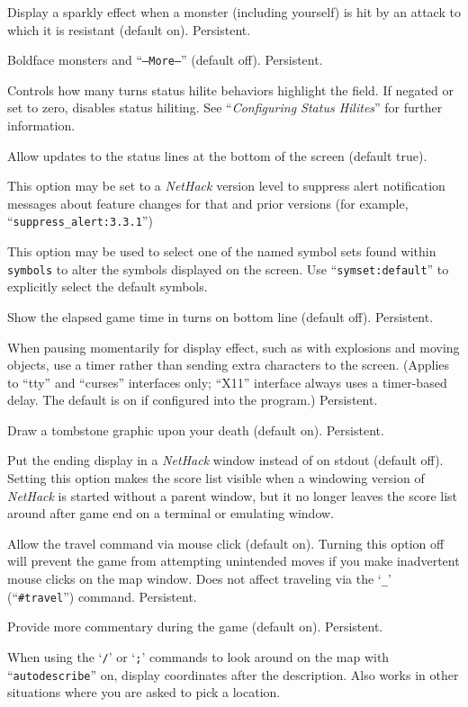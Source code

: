 \item[\ib{sparkle}]
Display a sparkly effect when a monster (including yourself) is hit by an
attack to which it is resistant (default on).  Persistent.
\item[\ib{standout}]
Boldface monsters and ``{\tt --More--}'' (default off).  Persistent.
\item[\ib{statushilites}]
Controls how many turns status hilite behaviors highlight
the field. If negated or set to zero, disables status hiliting.
See ``{\it Configuring Status Hilites\/}'' for further information.
\item[\ib{status\verb+_+updates}]
Allow updates to the status lines at the bottom of the screen (default true).
\item[\ib{suppress\verb+_+alert}]
This option may be set to a {\it NetHack\/} version level to suppress
alert notification messages about feature changes for that
and prior versions (for example, ``{\tt suppress\verb+_+alert:3.3.1}'')
\item[\ib{symset}]
This option may be used to select one of the named symbol sets found within
{\tt symbols} to alter the symbols displayed on the screen.
Use ``{\tt symset:default}'' to explicitly select the default symbols.
\item[\ib{time}]
Show the elapsed game time in turns on bottom line (default off).  Persistent.
\item[\ib{timed\verb+_+delay}]
When pausing momentarily for display effect, such as with explosions and
moving objects, use a timer rather than sending extra characters to the
screen.  (Applies to ``tty'' and ``curses'' interfaces only; ``X11'' interface always
uses a timer-based delay.  The default is on if configured into the
program.)  Persistent.
\item[\ib{tombstone}]
Draw a tombstone graphic upon your death (default on).  Persistent.
\item[\ib{toptenwin}]
Put the ending display in a {\it NetHack\/} window instead of on stdout (default off).
Setting this option makes the score list visible when a windowing version
of {\it NetHack\/} is started without a parent window, but it no longer leaves
the score list around after game end on a terminal or emulating window.
\item[\ib{travel}]
Allow the travel command via mouse click (default on).
Turning this option off will prevent the game from attempting unintended
moves if you make inadvertent mouse clicks on the map window.
Does not affect traveling via the `{\tt \verb+_+}' (``{\tt \#travel}'')
command.  Persistent.
\item[\ib{verbose}]
Provide more commentary during the game (default on).  Persistent.
\item[\ib{whatis\verb+_+coord}]
When using the `{\tt /}' or `{\tt ;}' commands to look around on the map with
``{\tt autodescribe}''
on, display coordinates after the description.
Also works in other situations where you are asked to pick a location.\\

